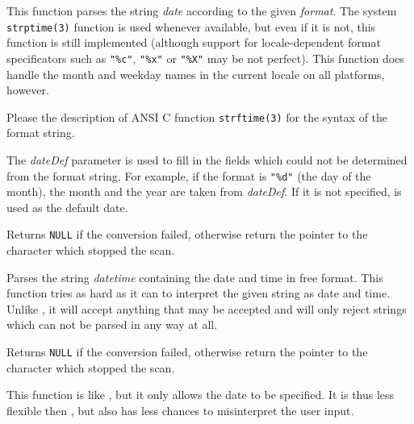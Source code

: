 \label{wxdatetimeparseformat}


This function parses the string {\it date} according to the given
{\it format}. The system {\tt strptime(3)} function is used whenever available,
but even if it is not, this function is still implemented (although support
for locale-dependent format specificators such as {\tt "\%c"}, {\tt "\%x"} or
{\tt "\%X"} may be not perfect). This function does handle the month and
weekday names in the current locale on all platforms, however.

Please the description of ANSI C function {\tt strftime(3)} for the syntax of
the format string.

The {\it dateDef} parameter is used to fill in the fields which could not be
determined from the format string. For example, if the format is {\tt "\%d"}
(the day of the month), the month and the year are taken from {\it dateDef}.
If it is not specified,  is used as the
default date.

Returns {\tt NULL} if the conversion failed, otherwise return the pointer to
the character which stopped the scan.

\label{wxdatetimeparsedatetime}


Parses the string {\it datetime} containing the date and time in free format.
This function tries as hard as it can to interpret the given string as date
and time. Unlike , it
will accept anything that may be accepted and will only reject strings which
can not be parsed in any way at all.

Returns {\tt NULL} if the conversion failed, otherwise return the pointer to
the character which stopped the scan.

\label{wxdatetimeparsedate}


This function is like , but it
only allows the date to be specified. It is thus less flexible then 
, but also has less chances to
misinterpret the user input.

